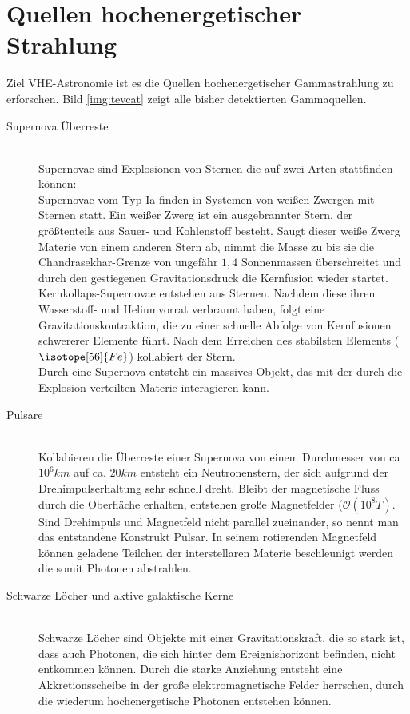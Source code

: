 \section{Quellen hochenergetischer Strahlung}
Ziel VHE-Astronomie ist es die Quellen hochenergetischer Gammastrahlung zu erforschen. Bild \ref{img:tevcat} zeigt alle bisher detektierten Gammaquellen.
\begin{description}
\item[Supernova Überreste]\hfill \\
Supernovae sind Explosionen von Sternen die auf zwei Arten stattfinden können:\\Supernovae vom Typ Ia finden in Systemen von weißen Zwergen mit Sternen statt. Ein weißer Zwerg ist ein ausgebrannter Stern, der größtenteils aus Sauer- und Kohlenstoff besteht. Saugt dieser weiße Zwerg Materie von einem anderen Stern ab, nimmt die Masse zu bis sie die Chandrasekhar-Grenze von ungefähr $1,4$ Sonnenmassen \cite{Grupen} überschreitet und durch den gestiegenen Gravitationsdruck die Kernfusion wieder startet.\\Kernkollaps-Supernovae entstehen aus Sternen. Nachdem diese ihren Wasserstoff- und Heliumvorrat verbrannt haben, folgt eine Gravitationskontraktion, die zu einer schnelle Abfolge von Kernfusionen schwererer Elemente führt. Nach dem Erreichen des stabilsten Elements ($\isotope[56]{Fe}$) kollabiert der Stern.\\Durch eine Supernova entsteht ein massives Objekt, das mit der durch die Explosion verteilten Materie interagieren kann.
\item[Pulsare]\hfill \\
Kollabieren die Überreste einer Supernova von einem Durchmesser von ca $10^6\unit{km}$ auf ca. $20\unit{km}$ entsteht ein Neutronenstern, der sich aufgrund der Drehimpulserhaltung sehr schnell dreht. Bleibt der magnetische Fluss durch die Oberfläche erhalten, entstehen große Magnetfelder ($\mathcal{O}(10^8\unit{T})$\cite{Grupen}. Sind Drehimpuls und Magnetfeld nicht parallel zueinander, so nennt man das entstandene Konstrukt Pulsar. In seinem rotierenden Magnetfeld können geladene Teilchen der interstellaren Materie beschleunigt werden die somit Photonen abstrahlen.
\item[Schwarze Löcher und aktive galaktische Kerne]\hfill \\
Schwarze Löcher sind Objekte mit einer Gravitationskraft, die so stark ist, dass auch Photonen, die sich hinter dem Ereignishorizont befinden, nicht entkommen können. Durch die starke Anziehung entsteht eine Akkretionsscheibe in der große elektromagnetische Felder herrschen, durch die wiederum hochenergetische Photonen entstehen können.

\end{description}
